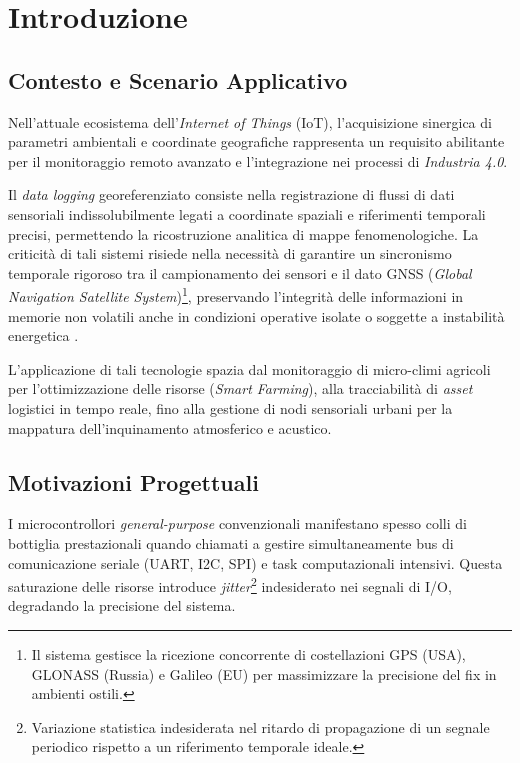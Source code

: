 \newpage
\section{Introduzione}

\subsection{Contesto e Scenario Applicativo}
Nell'attuale ecosistema dell'\textit{Internet of Things} (IoT), l'acquisizione sinergica di parametri ambientali e coordinate geografiche rappresenta un requisito abilitante per il monitoraggio remoto avanzato e l'integrazione nei processi di \textit{Industria 4.0}.

Il \textit{data logging} georeferenziato consiste nella registrazione di flussi di dati sensoriali indissolubilmente legati a coordinate spaziali e riferimenti temporali precisi, permettendo la ricostruzione analitica di mappe fenomenologiche. La criticità di tali sistemi risiede nella necessità di garantire un sincronismo temporale rigoroso tra il campionamento dei sensori e il dato GNSS (\textit{Global Navigation Satellite System})\footnote{Il sistema gestisce la ricezione concorrente di costellazioni GPS (USA), GLONASS (Russia) e Galileo (EU) per massimizzare la precisione del fix in ambienti ostili.}, preservando l'integrità delle informazioni in memorie non volatili anche in condizioni operative isolate o soggette a instabilità energetica \cite{sam_m8q_ds}.

L'applicazione di tali tecnologie spazia dal monitoraggio di micro-climi agricoli per l'ottimizzazione delle risorse (\textit{Smart Farming}), alla tracciabilità di \textit{asset} logistici in tempo reale, fino alla gestione di nodi sensoriali urbani per la mappatura dell'inquinamento atmosferico e acustico.

\subsection{Motivazioni Progettuali}
I microcontrollori \textit{general-purpose} convenzionali manifestano spesso colli di bottiglia prestazionali quando chiamati a gestire simultaneamente bus di comunicazione seriale (UART, I2C, SPI) e task computazionali intensivi. Questa saturazione delle risorse introduce \textit{jitter}\footnote{Variazione statistica indesiderata nel ritardo di propagazione di un segnale periodico rispetto a un riferimento temporale ideale.} indesiderato nei segnali di I/O, degradando la precisione del sistema. 

